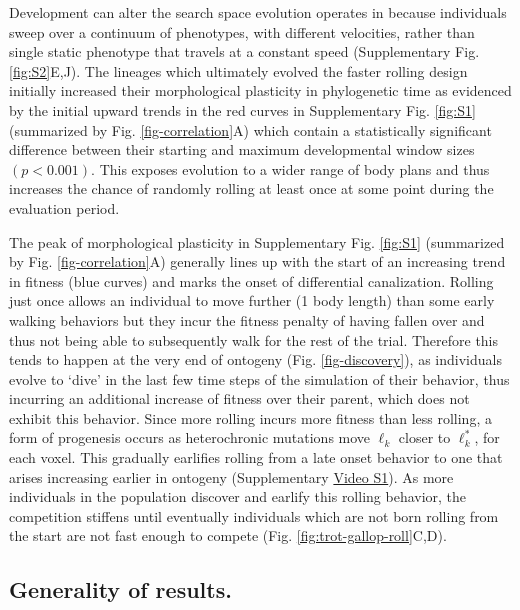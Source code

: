 Development can alter the search space evolution operates in because individuals sweep over a continuum of phenotypes, with different velocities, rather than single static phenotype that travels at a constant speed (Supplementary Fig. \ref{fig:S2}E,J).%
The lineages which ultimately evolved the faster rolling design initially increased their morphological plasticity in phylogenetic time as evidenced by the initial upward trends in the red curves in Supplementary Fig. \ref{fig:S1}%
(summarized by Fig. \ref{fig-correlation}A) which contain a statistically significant difference between their starting and maximum developmental window sizes $(p<0.001)$.
This exposes evolution to a wider range of body plans and thus increases the chance of randomly rolling at least once at some point during the evaluation period.

The peak of morphological plasticity in  Supplementary Fig. \ref{fig:S1}%
(summarized by Fig. \ref{fig-correlation}A) generally lines up with the start of an increasing trend in fitness (blue curves) and marks the onset of differential canalization.
Rolling just once allows an individual to move further (1 body length) than some early walking behaviors but they incur the fitness penalty of having fallen over and thus not being able to subsequently walk for the rest of the trial. 
Therefore this tends to happen at the very end of ontogeny (Fig. \ref{fig-discovery}), as individuals evolve to `dive' in the last few time steps of the simulation of their behavior, thus incurring an additional increase of fitness over their parent, which does not exhibit this behavior.
Since more rolling incurs more fitness than less rolling, a form of progenesis occurs as heterochronic mutations move $\ell_k$ closer to $\ell_k^*$, for each voxel.
This gradually earlifies rolling from a late onset behavior to one that arises increasing earlier in ontogeny (Supplementary \href{https://youtu.be/Ee2sU-AZWC4}{Video S1}).
As more individuals in the population discover and earlify this rolling behavior, the competition stiffens until eventually individuals which are not born rolling from the start are not fast enough to compete (Fig. \ref{fig:trot-gallop-roll}C,D).


\subsection*{Generality of results.}


